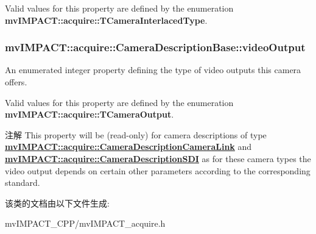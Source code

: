 Valid values for this property are defined by the enumeration {\bfseries mv\+I\+M\+P\+A\+C\+T\+::acquire\+::\+T\+Camera\+Interlaced\+Type}. \hypertarget{classmv_i_m_p_a_c_t_1_1acquire_1_1_camera_description_base_ad9b68e97cdf203d455e773e0901324a7}{
\subsubsection[{video\+Output}]{ mv\+I\+M\+P\+A\+C\+T\+::acquire\+::\+Camera\+Description\+Base\+::video\+Output}}\label{classmv_i_m_p_a_c_t_1_1acquire_1_1_camera_description_base_ad9b68e97cdf203d455e773e0901324a7}


An enumerated integer property defining the type of video outputs this camera offers. 

Valid values for this property are defined by the enumeration {\bfseries mv\+I\+M\+P\+A\+C\+T\+::acquire\+::\+T\+Camera\+Output}.

\begin{DoxyNote}{注解}
This property will be {\bfseries }(read-\/only) for camera descriptions of type {\bfseries \hyperlink{classmv_i_m_p_a_c_t_1_1acquire_1_1_camera_description_camera_link}{mv\+I\+M\+P\+A\+C\+T\+::acquire\+::\+Camera\+Description\+Camera\+Link}} and {\bfseries \hyperlink{classmv_i_m_p_a_c_t_1_1acquire_1_1_camera_description_s_d_i}{mv\+I\+M\+P\+A\+C\+T\+::acquire\+::\+Camera\+Description\+S\+D\+I}} as for these camera types the video output depends on certain other parameters according to the corresponding standard. 
\end{DoxyNote}


该类的文档由以下文件生成\+:\begin{DoxyCompactItemize}
\item 
mv\+I\+M\+P\+A\+C\+T\+\_\+\+C\+P\+P/mv\+I\+M\+P\+A\+C\+T\+\_\+acquire.\+h\end{DoxyCompactItemize}
